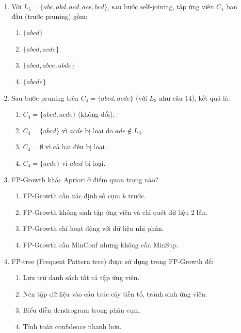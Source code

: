 \documentclass[10pt]{article}
\begin{document}
\begin{enumerate}[leftmargin=*, label=\textbf{Câu \arabic*.}]
    \item Với $L_3 = \{abc, abd, acd, ace, bcd\}$, sau bước self-joining, tập ứng viên $C_4$ ban đầu (trước pruning) gồm:
    \begin{enumerate}[label=\Alph*.]
        \item $\{abcd\}$
        \item $\{abcd, acde\}$
        \item $\{abcd, abce, abde\}$
        \item $\{abcde\}$
    \end{enumerate}

    \item Sau bước pruning trên $C_4 = \{abcd, acde\}$ (với $L_3$ như câu 14), kết quả là:
    \begin{enumerate}[label=\Alph*.]
        \item $C_4 = \{abcd, acde\}$ (không đổi).
        \item $C_4 = \{abcd\}$ vì $acde$ bị loại do $ade \notin L_3$.
        \item $C_4 = \emptyset$ vì cả hai đều bị loại.
        \item $C_4 = \{acde\}$ vì $abcd$ bị loại.
    \end{enumerate}

    \item FP-Growth khác Apriori ở điểm quan trọng nào?
    \begin{enumerate}[label=\Alph*.]
        \item FP-Growth cần xác định số cụm $k$ trước.
        \item FP-Growth không sinh tập ứng viên và chỉ quét dữ liệu 2 lần.
        \item FP-Growth chỉ hoạt động với dữ liệu nhị phân.
        \item FP-Growth cần MinConf nhưng không cần MinSup.
    \end{enumerate}

    \item FP-tree (Frequent Pattern tree) được sử dụng trong FP-Growth để:
    \begin{enumerate}[label=\Alph*.]
        \item Lưu trữ danh sách tất cả tập ứng viên.
        \item Nén tập dữ liệu vào cấu trúc cây tiền tố, tránh sinh ứng viên.
        \item Biểu diễn dendrogram trong phân cụm.
        \item Tính toán confidence nhanh hơn.
    \end{enumerate}


\end{enumerate}
\end{document}
